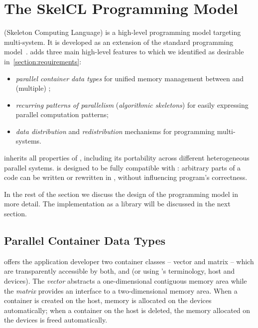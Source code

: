 \section{The SkelCL Programming Model}
\label{section:skelcl-programming-model}
\SkelCL (Skeleton Computing Language) is a high-level programming model targeting multi-\GPU system.
It is developed as an extension of the standard \OpenCL programming model~\cite{OpenCL}.
\SkelCL adds three main high-level features to \OpenCL which we identified as desirable in~\autoref{section:requirements}:

\begin{itemize}
  \item \emph{parallel container data types} for unified memory management between \CPU and (multiple) \GPUs;
  \item \emph{recurring patterns of parallelism} (\aka \emph{algorithmic skeletons}) for easily expressing parallel computation patterns;
  \item \emph{data distribution} and \emph{redistribution} mechanisms for programming multi-\GPU systems.
\end{itemize}

\noindent
\SkelCL inherits all properties of \OpenCL, including its portability across different heterogeneous parallel systems.
\SkelCL is designed to be fully compatible with \OpenCL: arbitrary parts of a \SkelCL code can be written or rewritten in \OpenCL, without influencing program's correctness.

In the rest of the section we discuss the design of the \SkelCL programming model in more detail.
The implementation as a \Cpp library will be discussed in the next section.

\subsection{Parallel Container Data Types}
\label{section:skelcl-programming-model:container}
\SkelCL offers the application developer two container classes -- vector and matrix -- which are transparently accessible by both, \CPU and \GPUs (or using \OpenCL's terminology, host and devices).
The \emph{vector} abstracts a one-dimensional contiguous memory area while the \emph{matrix} provides an interface to a two-dimensional memory area.
When a container is created on the host, memory is allocated on the devices automatically;
when a container on the host is deleted, the memory allocated on the devices is freed automatically.

